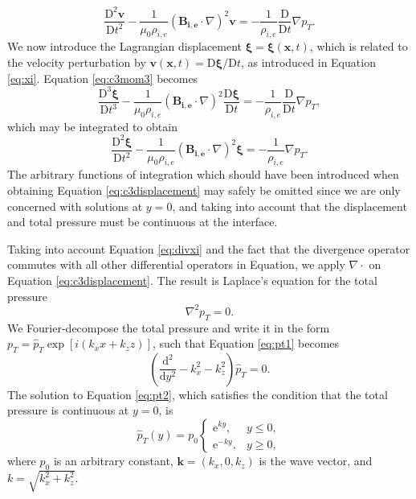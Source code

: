 %
\begin{equation}
\label{eq:c3mom3}
\frac{\mathrm{D}^2 \mathbf{v}}{\mathrm{D} t^2}
- \frac{1}{\mu_0 \rho_{i, e}}( \mathbf{B_{i, e}} \cdot \nabla )^2 \mathbf{v}
= - \frac{1}{\rho_{i, e}} \frac{\mathrm{D}}{\mathrm{D} t} \nabla p_T.
\end{equation}
%
We now introduce the Lagrangian displacement $\bm \xi = \bm \xi(\mathbf{x}, t)$, which is related to the velocity perturbation by $\mathbf v (\mathbf{x}, t) = \mathrm{D} \bm \xi / \mathrm{D} t$, as introduced in Equation \eqref{eq:xi}.
Equation \eqref{eq:c3mom3} becomes
%
\begin{equation}
\label{eq:c3displacement0}
\frac{\mathrm{D}^3 \bm \xi}{\mathrm{D} t^3}
- \frac{1}{\mu_0\rho_{i, e}} ( \mathbf{B_{i, e}} \cdot \nabla )^2
\frac{\mathrm{D} \bm \xi}{\mathrm{D} t}
= - \frac{1}{\rho_{i, e}} \frac{\mathrm{D}}{\mathrm{D} t} \nabla p_T,
\end{equation}
%
which may be integrated to obtain
%
\begin{equation}
\label{eq:c3displacement}
\frac{\mathrm{D}^2 \bm \xi}{\mathrm{D} t^2}
- \frac{1}{\mu_0\rho_{i, e}} ( \mathbf{B_{i, e}} \cdot \nabla )^2 \bm \xi
= - \frac{1}{\rho_{i, e}} \nabla p_T.
\end{equation}
%
The arbitrary functions of integration which should have been introduced when obtaining Equation \eqref{eq:c3displacement} may safely be omitted since we are only concerned with solutions at $y=0$, and taking into account that the displacement and total pressure must be continuous at the interface.

Taking into account Equation \eqref{eq:divxi} and the fact that the divergence operator commutes with all other differential operators in Equation, we apply $\nabla \cdot$ on Equation \eqref{eq:c3displacement}.
The result is Laplace's equation for the total pressure
%
\begin{equation}
\label{eq:pt1}
\nabla^2 p_T = 0.
\end{equation}
%
We Fourier-decompose the total pressure and write it in the form $p_T = \hat p_T \exp[i (k_x x + k_z z)]$, such that Equation \eqref{eq:pt1} becomes
%
\begin{equation}
\label{eq:pt2}
\left( \frac{\mathrm{d}^2}{\mathrm{d} y^2} - k_x^2 - k_z^2 \right) \hat p_T = 0.
\end{equation}
%
The solution to Equation \eqref{eq:pt2}, which satisfies the condition that the total pressure is continuous at $y = 0$, is
%
\begin{equation}
\label{eq:ptsol}
\hat p_T(y) = p_0\left\{\begin{array}{cc} \mathrm{e}^{ky}, & y \leq 0, \\
\mathrm{e}^{-ky}, & y \geq 0 , \end{array}\right.
\end{equation}
%
where $p_0$ is an arbitrary constant, $\mathbf{k} = (k_x, 0, k_z)$ is the wave vector, and $k = \sqrt{k_x^2 + k_z^2}$.

